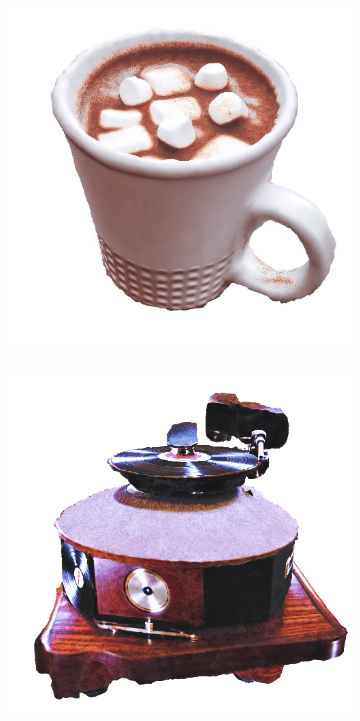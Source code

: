 \begin{figure}[ht]
    \centering
    \small
    \begin{subfigure}[b]{0.3\textwidth}
        \centering
        \includegraphics[width=\textwidth]{etc/Original/fantasia_a_mug_of_hot_chocolate_with_whipped_cream_and_marshmallows.PNG}
        \caption{}
    \end{subfigure}
    \begin{subfigure}[b]{0.3\textwidth}
        \centering
        \includegraphics[width=\textwidth]{etc/Original/fantasia_a_vintage_record_player.PNG}

\end{subfigure}
\end{figure}
